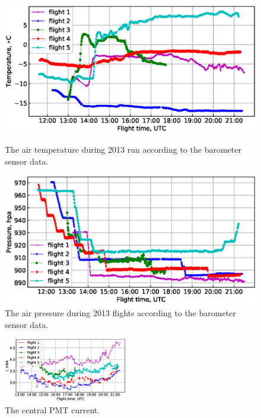 \documentclass[final,5p,times,twocolumn]{elsarticle}
\begin{document}
\begin{figure}[tb]
    \begin{minipage}[t]{0.48\textwidth}
    \centering
    \includegraphics[width=\textwidth]{figs/T1.eps}
    \caption{The air temperature during 2013 run according to the barometer sensor data.}
    \label{fig:temperature}
    \end{minipage}
    \hfill
    \begin{minipage}[t]{0.48\textwidth}
    \centering
    \includegraphics[width=\textwidth]{figs/P_hpa0.eps}
    \caption{The air pressure during 2013 flights according to the barometer sensor data.}
    \label{fig:pressure}
    \end{minipage}
\end{figure}

\begin{figure}[tb]
\includegraphics[width=0.48\textwidth]{figs/cur2013_PMT1.eps}
\caption{The central PMT current.}
\label{fig:current}
\end{figure}
\end{document}
